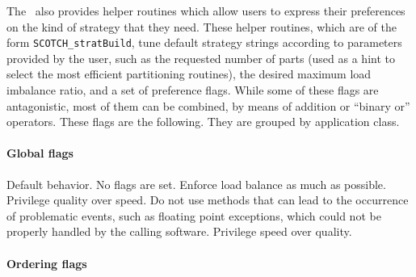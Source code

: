 The \libscotch\ also provides helper routines which allow users to
express their preferences on the kind of strategy that they
need. These helper routines, which are of the form
{\tt SCOTCH\_\lbt strat\lbt *\lbt Build}, tune default strategy strings
according to parameters provided by the user, such as the requested
number of parts (used as a hint to select the most efficient
partitioning routines), the desired maximum load imbalance ratio,
and a set of preference flags. While some of these flags are
antagonistic, most of them can be combined, by means of addition or
``binary or'' operators. These flags are the following.
They are grouped by application class.

\paragraph{Global flags}

\begin{itemize}
Default behavior. No flags are set.
Enforce load balance as much as possible.
Privilege quality over speed.
Do not use methods that can lead to the occurrence of problematic
events, such as floating point exceptions, which could not be properly
handled by the calling software.
Privilege speed over quality.
\end{itemize}



\paragraph{Ordering flags}

